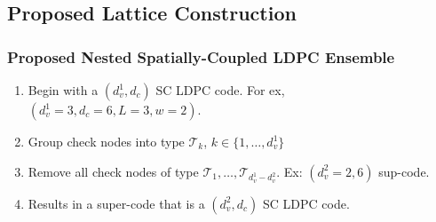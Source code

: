 \documentclass[10pt,presentation]{beamer}
\begin{document}
\subsection{Proposed Lattice Construction}
\begin{frame}\frametitle{Proposed Nested Spatially-Coupled LDPC Ensemble}
    \begin{enumerate}
        \item<1-> Begin with a $(d_v^1,d_c)$ SC LDPC code. For ex, $(d_v^1=3,d_c=6,L=3,w=2)$. 
        \item<1-> Group check nodes into type $\mathcal{T}_k$, $k\in\{1,\ldots,d_v^1\}$
         \vspace{2pt}
        \item<2-> Remove all check nodes of type $\mathcal{T}_1,\ldots,\mathcal{T}_{d_v^1-d_v^2}$. Ex: $(d_{v}^{2}=2,6)$ sup-code.
                 \vspace{2pt}
        \item<3-> Results in a super-code that is a $(d_v^2,d_c)$ SC LDPC code.
    \end{enumerate}
    \vspace{0.15in}
    \begin{figure}
        \begin{center}

\end{center}
\end{figure}
\end{frame}
\end{document}
